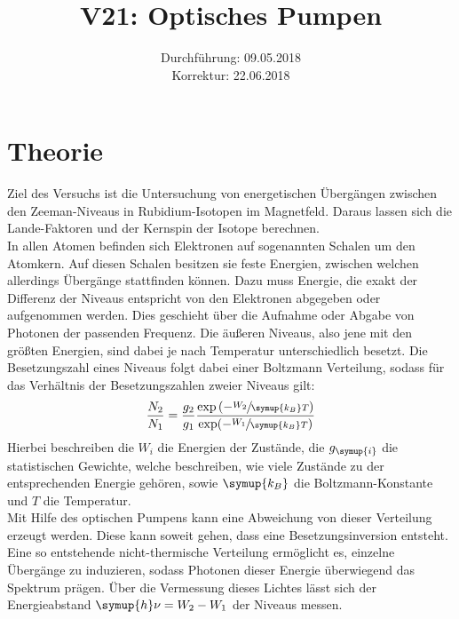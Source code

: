 \documentclass[
  bibliography=totoc,     %
  captions=tableheading,  %
  titlepage=firstiscover, %
]{scrartcl}
\title{V21: Optisches Pumpen}
\author{
  Simon Schulte
  \texorpdfstring{
    \\
    \href{mailto:simon.schulte@udo.edu}{simon.schulte@udo.edu}
  }{}
  \texorpdfstring{\and}{, }
  Tim Sedlaczek
  \texorpdfstring{
    \\
    \href{mailto:tim.sedlaczek@udo.edu}{tim.sedlaczek@udo.edu}
  }{}
}
\date{Durchführung: 09.05.2018\\
      Korrektur: 22.06.2018}
\begin{document}
\maketitle
\thispagestyle{empty}
\setcounter{page}{1}
\section{Theorie}
\label{sec:theorie}
Ziel des Versuchs ist die Untersuchung von energetischen Übergängen zwischen den
Zeeman-Niveaus in Rubidium-Isotopen im Magnetfeld. Daraus lassen sich die
Lande-Faktoren und der Kernspin der Isotope berechnen. \\
In allen Atomen befinden sich Elektronen auf sogenannten Schalen um den
Atomkern. Auf diesen Schalen besitzen sie feste Energien, zwischen welchen
allerdings Übergänge stattfinden können. Dazu muss Energie, die exakt der
Differenz der Niveaus entspricht von den Elektronen abgegeben oder aufgenommen
werden. Dies geschieht über die Aufnahme oder Abgabe von Photonen der
passenden Frequenz. Die äußeren Niveaus, also jene mit den größten Energien,
sind dabei je nach Temperatur unterschiedlich besetzt. Die Besetzungszahl eines
Niveaus folgt dabei einer Boltzmann Verteilung, sodass für das Verhältnis der
Besetzungszahlen zweier Niveaus gilt:
%
\begin{equation}
  \frac{N_2}{N_1}=\frac{g_2}{g_1}\frac{\exp\left(-\sfrac{W_2}{\symup{k_B}T}\right)}{\exp(-\sfrac{W_1}{\symup{k_B}T})}
\end{equation}
%
Hierbei beschreiben die $W_i$ die Energien der Zustände, die $g_{\symup{i}}$ die
statistischen Gewichte, welche beschreiben, wie viele Zustände zu der entsprechenden
Energie gehören, sowie $\symup{k_B}$ die Boltzmann-Konstante und $T$ die
Temperatur. \\
Mit Hilfe des optischen Pumpens kann eine Abweichung von dieser Verteilung
erzeugt werden. Diese kann soweit gehen, dass eine Besetzungsinversion
entsteht. Eine so entstehende nicht-thermische Verteilung ermöglicht es,
einzelne Übergänge zu induzieren, sodass Photonen dieser Energie überwiegend
das Spektrum prägen. Über die Vermessung dieses Lichtes lässt sich der
Energieabstand $\symup{h}\nu=W_2-W_1$ der Niveaus messen.
\end{document}
